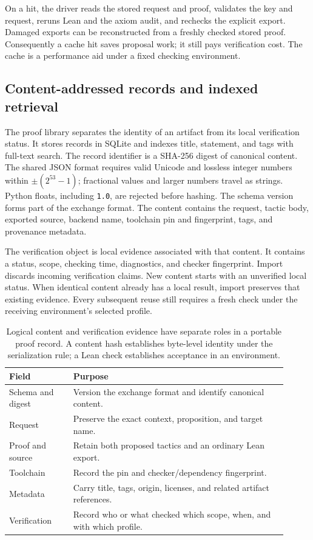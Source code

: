 \documentclass[10pt,a4paper]{article}
\newcommand{\code}[1]{\texttt{#1}}
\begin{document}
On a hit, the driver reads the stored request and proof, validates the key and
request, reruns Lean and the axiom audit, and rechecks the explicit export.
Damaged exports can be reconstructed from a freshly checked stored proof.
Consequently a cache hit saves proposal work; it still pays verification cost.
The cache is a performance aid under a fixed checking environment.

\subsection{Content-addressed records and indexed retrieval}
The proof library separates the identity of an artifact from its local
verification status. It stores records in SQLite and indexes title, statement, and tags
with full-text search. The record identifier is a SHA-256 digest of canonical
content. The shared JSON format requires valid Unicode and lossless integer
numbers within $\pm(2^{53}-1)$; fractional values and larger numbers travel as
strings. Python floats, including \code{1.0}, are rejected before hashing. The
schema version forms part of the exchange format. The content
contains the request, tactic body, exported source, backend name, toolchain
pin and fingerprint, tags, and provenance metadata.

The verification object is local evidence associated with that content. It
contains a status, scope, checking time, diagnostics, and checker fingerprint.
Import discards incoming verification claims. New content starts with an
unverified local status. When identical content already has a local result,
import preserves that existing evidence. Every subsequent reuse still requires
a fresh check under the receiving environment's selected profile.

\begin{table}[htbp]
\centering\small
\begin{tabular}{>{\raggedright\arraybackslash}p{0.21\linewidth}>{\raggedright\arraybackslash}p{0.70\linewidth}}
\toprule
Field & Purpose \\
\midrule
Schema and digest & Version the exchange format and identify canonical content.\\
Request & Preserve the exact context, proposition, and target name.\\
Proof and source & Retain both proposed tactics and an ordinary Lean export.\\
Toolchain & Record the pin and checker/dependency fingerprint.\\
Metadata & Carry title, tags, origin, licenses, and related artifact references.\\
Verification & Record who or what checked which scope, when, and with which profile.\\
\bottomrule
\end{tabular}
\caption{Logical content and verification evidence have separate roles in a
portable proof record. A content hash establishes byte-level identity under
the serialization rule; a Lean check establishes acceptance in an environment.}
\label{tab:record}
\end{table}
\end{document}
